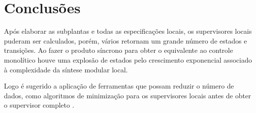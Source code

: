 \section{Conclusões}
Após elaborar as subplantas e todas as especificações locais, os supervisores locais puderam ser calculados, porém, vários retornam um grande número de estados e transições. Ao fazer o produto síncrono para obter o equivalente ao controle monolítico houve uma explosão de estados pelo crescimento exponencial associado à complexidade da síntese modular local.

Logo é sugerido a aplicação de ferramentas que possam reduzir o número de dados, como algoritmos de minimização para os supervisores locais antes de obter o supervisor completo \cite{Queiroz2002}.